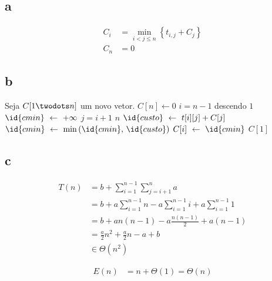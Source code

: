 \subsection{a}

\begin{align*}
    C_i &= \min_{i < j \leq n}\left\{t_{i, j} + C_j\right\} \\
    C_n &= 0
\end{align*}

\subsection{b}

\begin{codebox}
    \li Seja $C[1 \twodots n]$ um novo vetor.
    \li
    \li $C[n] \gets 0$
    \li {} $i = n - 1$ descendo  $1$
        \Do
    \li     $\id{cmin} \gets +\infty$
    \li     {} $j = i + 1$  $n$
            \Do
    \li         $\id{custo} \gets t[i][j] + C[j]$
    \li         $\id{cmin} \gets \min\left(\id{cmin},\, \id{custo}\right)$
            \End
    \li     $C[i] \gets \id{cmin}$
        \End
    \li
    \li {} $C[1]$
\end{codebox}

\subsection{c}

\begin{align*}
    T(n) &= b + \sum_{i = 1}^{n - 1} \sum_{j = i + 1}^n a \\
    &= b + a \sum_{i = 1}^{n - 1} n - a \sum_{i = 1}^{n - 1} i + a \sum_{i = 1}^{n - 1} 1 \\
    &= b + a n (n - 1) - a \frac{n (n - 1)}{2} + a (n - 1) \\
    &= \frac{a}{2} n^2 + \frac{a}{2} n - a + b \\
    &\in \Theta\left(n^2\right)
\end{align*}

\begin{align*}
    E(n) &= n + \Theta(1) = \Theta(n)
\end{align*}
